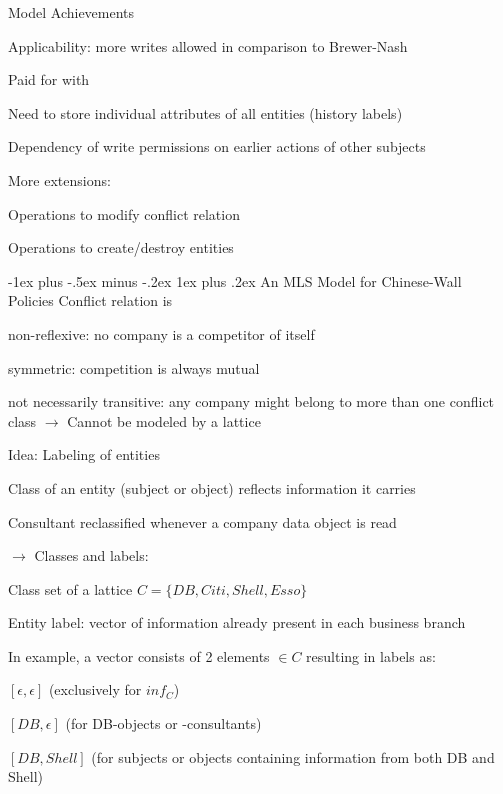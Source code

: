\documentclass[a4paper]{article}
\makeatletter
\renewcommand{\subsubsection}{\@startsection{subsubsection}{3}{0mm}%
                                {-1ex plus -.5ex minus -.2ex}%
                                {1ex plus .2ex}%
                                {\normalfont\small\bfseries}}
\makeatother
\begin{document}
\begin{multicols}{3}
    Model Achievements
    \begin{itemize*}
        \item Applicability: more writes allowed in comparison to Brewer-Nash
        \item Paid for with
        \begin{itemize*}
            \item Need to store individual attributes of all entities (history labels)
            \item Dependency of write permissions on earlier actions of other subjects
        \end{itemize*}
        \item More extensions:
        \begin{itemize*}
            \item Operations to modify conflict relation
            \item Operations to create/destroy entities
        \end{itemize*}
    \end{itemize*}

    \subsubsection{An MLS Model for Chinese-Wall Policies}
    Conflict relation is
    \begin{itemize*}
        \item non-reflexive: no company is a competitor of itself
        \item symmetric: competition is always mutual
        \item not necessarily transitive: any company might belong to more than one conflict class $\rightarrow$ Cannot be modeled by a lattice
    \end{itemize*}

    Idea: Labeling of entities
    \begin{itemize*}
        \item Class of an entity (subject or object) reflects information it carries
        \item Consultant reclassified whenever a company data object is read
        \item $\rightarrow$ Classes and labels:
        \item Class set of a lattice $C=\{DB,Citi,Shell,Esso\}$
        \item Entity label: vector of information already present in each business branch
        \item In example, a vector consists of 2 elements $\in C$ resulting in labels as:
        \begin{itemize*}
            \item $[\epsilon,\epsilon]$ (exclusively for $inf_C$)
            \item $[DB,\epsilon]$ (for DB-objects or -consultants)
            \item $[DB,Shell]$ (for subjects or objects containing information from both DB and Shell)
        \end{itemize*}
    \end{itemize*}


\end{multicols}
\end{document}
